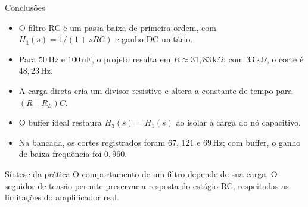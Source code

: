 \begin{frame}{Conclusões}
  \begin{itemize}
    \item O filtro RC é um passa-baixa de primeira ordem, com
      $H_1(s)=1/(1+sRC)$ e ganho DC unitário.
    \item Para $50\,\mathrm{Hz}$ e $100\,\mathrm{nF}$, o projeto resulta em
      $R\approx31{,}83\,\mathrm{k}\Omega$; com $33\,\mathrm{k}\Omega$, o corte é $48{,}23\,\mathrm{Hz}$.
    \item A carga direta cria um divisor resistivo e altera a constante de tempo para
      $(R\parallel R_L)C$.
    \item O buffer ideal restaura $H_3(s)=H_1(s)$ ao isolar a carga do nó capacitivo.
    \item Na bancada, os cortes registrados foram $67$, $121$ e $69\,\mathrm{Hz}$;
      com buffer, o ganho de baixa frequência foi $0{,}960$.
  \end{itemize}

  \begin{alertblock}{Síntese da prática}
    O comportamento de um filtro depende de sua carga.
    O seguidor de tensão permite preservar a resposta do estágio RC,
    respeitadas as limitações do amplificador real.
  \end{alertblock}
\end{frame}

